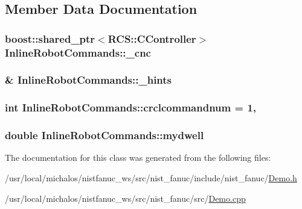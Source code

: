 \subsection{Member Data Documentation}
\hypertarget{classInlineRobotCommands_a30ef647cba21bf1ea526f144438d37b7}{
\subsubsection[{\-\_\-cnc}]{\setlength{\rightskip}{0pt plus 5cm}boost\-::shared\-\_\-ptr$<${\bf R\-C\-S\-::\-C\-Controller}$>$ Inline\-Robot\-Commands\-::\-\_\-cnc\hspace{0.3cm}{\ttfamily [protected]}}}\label{classInlineRobotCommands_a30ef647cba21bf1ea526f144438d37b7}
\hypertarget{classInlineRobotCommands_a0089ed745abbe24d8e0229be71deae04}{
\subsubsection[{\-\_\-hints}]{\& Inline\-Robot\-Commands\-::\-\_\-hints\hspace{0.3cm}{\ttfamily [protected]}}}\label{classInlineRobotCommands_a0089ed745abbe24d8e0229be71deae04}
\hypertarget{classInlineRobotCommands_a2186bbc7718fcaaaa1841d7a01c726d9}{
\subsubsection[{crclcommandnum}]{\setlength{\rightskip}{0pt plus 5cm}int Inline\-Robot\-Commands\-::crclcommandnum = 1\hspace{0.3cm}{\ttfamily [static]}, {\ttfamily [protected]}}}\label{classInlineRobotCommands_a2186bbc7718fcaaaa1841d7a01c726d9}
\hypertarget{classInlineRobotCommands_abe4d63965a1a4d3fafa630ace7305fd4}{
\subsubsection[{mydwell}]{\setlength{\rightskip}{0pt plus 5cm}double Inline\-Robot\-Commands\-::mydwell}}\label{classInlineRobotCommands_abe4d63965a1a4d3fafa630ace7305fd4}


The documentation for this class was generated from the following files\-:\begin{DoxyCompactItemize}
\item 
/usr/local/michalos/nistfanuc\-\_\-ws/src/nist\-\_\-fanuc/include/nist\-\_\-fanuc/\hyperlink{Demo_8h}{Demo.\-h}\item 
/usr/local/michalos/nistfanuc\-\_\-ws/src/nist\-\_\-fanuc/src/\hyperlink{Demo_8cpp}{Demo.\-cpp}\end{DoxyCompactItemize}

